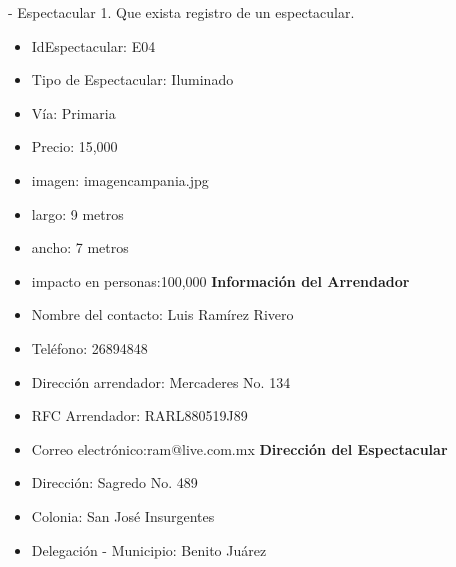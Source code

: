 - Espectacular 1. Que exista registro de un espectacular. 
\begin{itemize}
    \item IdEspectacular: E04
    \item Tipo de Espectacular: Iluminado
    \item Vía: Primaria
    \item Precio: 15,000
    \item imagen: imagencampania.jpg
    \item largo: 9 metros
    \item ancho: 7 metros
    \item impacto en personas:100,000
    \textbf{Información del Arrendador}
    \item Nombre del contacto: Luis Ramírez Rivero
    \item Teléfono: 26894848
    \item Dirección arrendador: Mercaderes No. 134
    \item RFC Arrendador: RARL880519J89
    \item Correo electrónico:ram@live.com.mx
    \textbf{Dirección del Espectacular}
    \item Dirección: Sagredo No. 489
    \item Colonia: San José Insurgentes
    \item Delegación - Municipio: Benito Juárez\\
\end{itemize}


